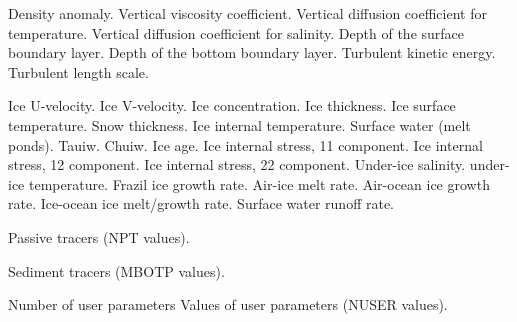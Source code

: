 \begin{klist}
\begin{klist}
          Density anomaly.
          Vertical viscosity coefficient.
          Vertical diffusion coefficient for
     temperature.
          Vertical diffusion coefficient for
     salinity.
          Depth of the surface boundary layer.
          Depth of the bottom boundary layer.
          Turbulent kinetic energy.
          Turbulent length scale.
     \end{klist}
    \mbox{}
     \begin{klist}
           Ice U-velocity.
           Ice V-velocity.
           Ice concentration.
           Ice thickness.
           Ice surface temperature.
           Snow thickness.
           Ice internal temperature.
           Surface water (melt ponds).
           Tauiw.
           Chuiw.
           Ice age.
           Ice internal stress, 11 component.
           Ice internal stress, 12 component.
           Ice internal stress, 22 component.
           Under-ice salinity.
           under-ice temperature.
           Frazil ice growth rate.
           Air-ice melt rate.
           Air-ocean ice growth rate.
           Ice-ocean ice melt/growth rate.
           Surface water runoff rate.
     \end{klist}
    \mbox{}
     \begin{klist}
           Passive tracers (NPT values).
     \end{klist}
    \mbox{}
     \begin{klist}
           Sediment tracers (MBOTP values).
     \end{klist}
    \mbox{}
     \begin{klist}
           Number of user parameters
            Values of user parameters (NUSER values).
     \end{klist}
    \mbox{}
     \begin{klist}

\end{klist}
\end{klist}
